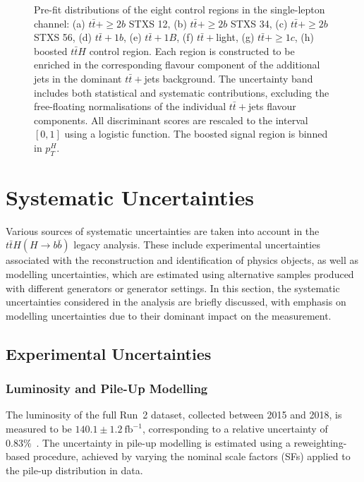 \begin{figure}[H]
    \caption{Pre-fit distributions of the eight control regions in the single-lepton channel: (a) $t\bar{t}+\geq 2b$ STXS 12, (b) $t\bar{t}+\geq 2b$ STXS 34, (c) $t\bar{t}+\geq 2b$ STXS 56, (d) $t\bar{t}+1b$, (e) $t\bar{t}+1B$, (f) $t\bar{t}+$light, (g) $t\bar{t}+\geq 1c$, (h) boosted $t\bar{t}H$ control region. Each region is constructed to be enriched in the corresponding flavour component of the additional jets in the dominant $t\bar{t}+$jets background. The uncertainty band includes both statistical and systematic contributions, excluding the free-floating normalisations of the individual $t\bar{t}+$jets flavour components. All discriminant scores are rescaled to the interval $[0,1]$ using a logistic function. The boosted signal region is binned in $p_{T}^{H}$.}
    \label{fig:1l_data_mc_pre_fit_CR}
\end{figure}
\section{Systematic Uncertainties}
\label{sec:systematics}
Various sources of systematic uncertainties are taken into account in the $t\bar{t}H(H \to b\bar{b})$ legacy analysis.  
These include experimental uncertainties associated with the reconstruction and identification of physics objects, as well as modelling uncertainties, which are estimated using alternative samples produced with different generators or generator settings.  
In this section, the systematic uncertainties considered in the analysis are briefly discussed, with emphasis on modelling uncertainties due to their dominant impact on the measurement.  

\subsection{Experimental Uncertainties}

\subsubsection{Luminosity and Pile-Up Modelling}
The luminosity of the full Run~2 dataset, collected between 2015 and 2018, is measured to be $140.1 \pm 1.2~\text{fb}^{-1}$, corresponding to a relative uncertainty of 0.83\%~\cite{atlas2022luminosity}.  
The uncertainty in pile-up modelling is estimated using a reweighting-based procedure, achieved by varying the nominal scale factors (SFs) applied to the pile-up distribution in data.  

